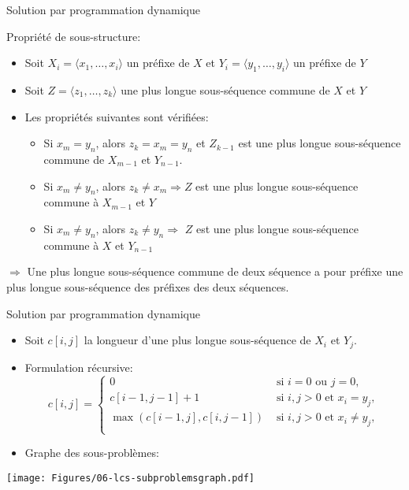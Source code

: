 \begin{frame}{Solution par programmation dynamique}

Propriété de sous-structure:
\begin{itemize}
\item Soit $X_i=\langle x_1,\ldots,x_i\rangle$ un préfixe de $X$ et
  $Y_i=\langle y_1,\ldots,y_i\rangle$ un préfixe de $Y$
\item Soit $Z=\langle z_1,\ldots,z_k\rangle$ une plus longue sous-séquence commune de $X$ et $Y$
\item Les propriétés suivantes sont vérifiées:
\begin{itemize}
\item Si $x_m=y_n$, alors $z_k=x_m=y_n$ et $Z_{k-1}$ est une plus
  longue sous-séquence commune de $X_{m-1}$ et $Y_{n-1}$.
\item Si $x_m\neq y_n$, alors $z_k\neq x_m\Rightarrow Z$ est une plus
  longue sous-séquence commune à $X_{m-1}$ et $Y$
\item Si $x_m\neq y_n$, alors $z_k\neq y_n\Rightarrow$ $Z$ est une
  plus longue sous-séquence commune à $X$ et $Y_{n-1}$
\end{itemize}
\end{itemize}
\alert{$\Rightarrow$} Une plus longue sous-séquence commune de deux séquence a pour préfixe
une plus longue sous-séquence des préfixes des deux séquences.

\end{frame}

\begin{frame}{Solution par programmation dynamique}
\begin{itemize}
\item Soit $c[i,j]$ la longueur d'une plus longue sous-séquence de $X_i$ et $Y_j$.
\item Formulation récursive:
\[c[i,j]=\left\{
\begin{array}{ll}
0 & \mbox{ si } i=0\mbox{ ou }j=0,\\
c[i-1,j-1]+1 & \mbox{ si }i,j>0\mbox{ et }x_i=y_j,\\
\max(c[i-1,j],c[i,j-1]) & \mbox{ si }i,j>0\mbox{ et }x_i\neq y_j,\\
\end{array}
\right.
\]
\item Graphe des sous-problèmes:
\end{itemize}

\centerline{\texttt{[image: Figures/06-lcs-subproblemsgraph.pdf]}}


\end{frame}

